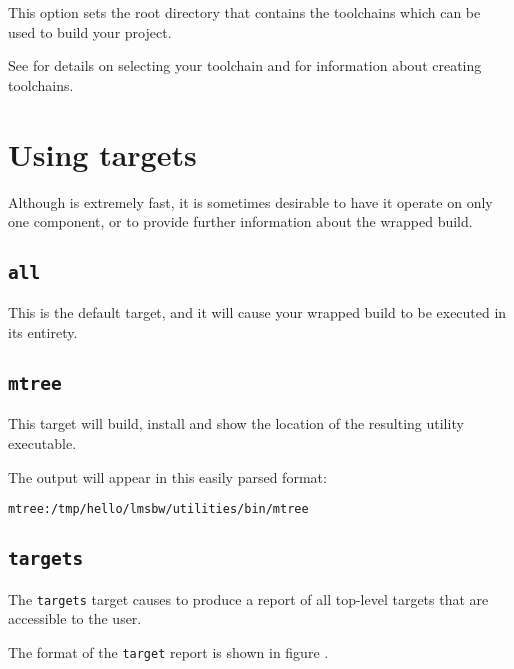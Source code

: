 This option sets the root directory that contains the toolchains which
can be used to build your project.

See  for details on selecting your
toolchain and  for information
about creating toolchains.

\section{Using \lmsbw targets}\label{lmsbw:target:verbs}

Although \lmsbw is extremely fast, it is sometimes desirable to have
it operate on only one component, or to provide further information
about the wrapped build.

\subsection{\texttt{all}}\label{lmsbw:target:all}

This is the default target, and it will cause your wrapped build to be
executed in its entirety.

\subsection{\texttt{mtree}}

This target will build, install and show the location of the resulting
\mtree utility executable.

The output will appear in this easily parsed format:

\begin{verbatim}
mtree:/tmp/hello/lmsbw/utilities/bin/mtree
\end{verbatim}

\subsection{\texttt{targets}}

The \texttt{targets} target causes \lmsbw to produce a report of all
top-level targets that are accessible to the user.

The format of the \texttt{target} report is shown in figure
.

